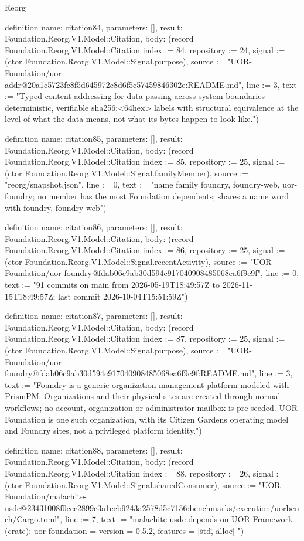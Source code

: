 \begin{lexlean}{Reorg}
\begin{semanticmodule}
definition{
  name: citation84,
  parameters: [],
  result: Foundation.Reorg.V1.Model::Citation,
  body: (record Foundation.Reorg.V1.Model::Citation {index := 84, repository := 24, signal := (ctor Foundation.Reorg.V1.Model::Signal.purpose), source := "UOR-Foundation/uor-addr@20a1c5723fc8f5d645972c8d6f5c57459846302e:README.md", line := 3, text := "Typed content-addressing for data passing across system boundaries — deterministic, verifiable sha256:<64hex> labels with structural equivalence at the level of what the data means, not what its bytes happen to look like."})
}

definition{
  name: citation85,
  parameters: [],
  result: Foundation.Reorg.V1.Model::Citation,
  body: (record Foundation.Reorg.V1.Model::Citation {index := 85, repository := 25, signal := (ctor Foundation.Reorg.V1.Model::Signal.familyMember), source := "reorg/snapshot.json", line := 0, text := "name family {foundry, foundry-web, uor-foundry}; no member has the most Foundation dependents; shares a name word with foundry, foundry-web"})
}

definition{
  name: citation86,
  parameters: [],
  result: Foundation.Reorg.V1.Model::Citation,
  body: (record Foundation.Reorg.V1.Model::Citation {index := 86, repository := 25, signal := (ctor Foundation.Reorg.V1.Model::Signal.recentActivity), source := "UOR-Foundation/uor-foundry@fdab06c9ab30d594c917040908485068ea6f9c9f", line := 0, text := "91 commits on main from 2026-05-19T18:49:57Z to 2026-11-15T18:49:57Z; last commit 2026-10-04T15:51:59Z"})
}

definition{
  name: citation87,
  parameters: [],
  result: Foundation.Reorg.V1.Model::Citation,
  body: (record Foundation.Reorg.V1.Model::Citation {index := 87, repository := 25, signal := (ctor Foundation.Reorg.V1.Model::Signal.purpose), source := "UOR-Foundation/uor-foundry@fdab06c9ab30d594c917040908485068ea6f9c9f:README.md", line := 3, text := "Foundry is a generic organization-management platform modeled with PrismPM. Organizations and their physical sites are created through normal workflows; no account, organization or administrator mailbox is pre-seeded. UOR Foundation is one such organization, with its Citizen Gardens operating model and Foundry sites, not a privileged platform identity."})
}

definition{
  name: citation88,
  parameters: [],
  result: Foundation.Reorg.V1.Model::Citation,
  body: (record Foundation.Reorg.V1.Model::Citation {index := 88, repository := 26, signal := (ctor Foundation.Reorg.V1.Model::Signal.sharedConsumer), source := "UOR-Foundation/malachite-usdc@23431008f0ccc2899c3a1ecb9243a2578d5c7156:benchmarks/execution/uorbench/Cargo.toml", line := 7, text := "malachite-usdc depends on UOR-Framework (crate): uor-foundation = { version = \"0.5.2\", features = [\"std\", \"alloc\"] }"})
}


\end{semanticmodule}
\end{lexlean}
